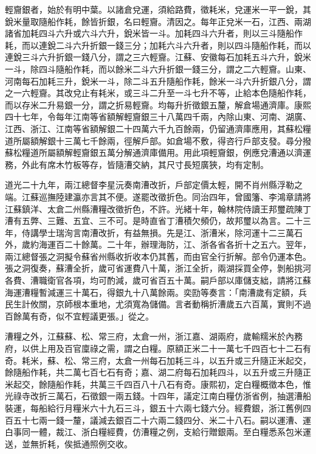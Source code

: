 \begin{pinyinscope}
輕齎銀者，始於有明中葉。以諸倉兌運，須給路費，徵耗米，兌運米一平一銳，其銳米量取隨船作耗，餘皆折銀，名曰輕齎。清因之。每年正兌米一石，江西、兩湖諸省加耗四斗六升或六斗六升，銳米皆一斗。加耗四斗六升者，則以三斗隨船作耗，而以連銳二斗六升折銀一錢三分；加耗六斗六升者，則以四斗隨船作耗，而以連銳三斗六升折銀一錢八分，謂之三六輕齎。江蘇、安徽每石加耗五斗六升，銳米一斗，除四斗隨船作耗，而以餘米二斗六升折銀一錢三分，謂之二六輕齎。山東、河南每石加耗三升，銳米一斗，除二斗五升隨船作耗，餘米一斗六升折銀八分，謂之一六輕齎。其改兌止有耗米，或三斗二升至一斗七升不等，止給本色隨船作耗，而以存米二升易銀一分，謂之折易輕齎。均每升折徵銀五釐，解倉場通濟庫。康熙四十七年，令每年江南等省額解輕齎銀三十八萬四千兩，內除山東、河南、湖廣、江西、浙江、江南等省額解銀二十四萬六千九百餘兩，仍留通濟庫應用，其蘇松糧道所屬額解銀十三萬七千餘兩，徑解戶部。如倉場不敷，得咨行戶部支發。尋分撥蘇松糧道所屬額解輕齎銀五萬分解通濟庫備用。用此項輕齎銀，例應兌漕通以濟運務，外此有席木竹板等存，皆隨漕交納，其尺寸長短廣狹，均有定制。

道光二十九年，兩江總督李星沅奏南漕改折，戶部定價太輕，開不肖州縣浮勒之端。江蘇巡撫陸建瀛亦言其不便。遂罷改徵折色。同治四年，曾國籓、李鴻章請將江蘇鎮洋、太倉二州縣漕糧改徵折色，不許。光緒十年，翰林院侍讀王邦璽疏陳丁漕有五弊、三難、五宜、三不可。是時直省丁漕積欠頻仍，故邦璽以為言。二十三年，侍講學士瑞洵言南漕改折，有益無損。先是江、浙漕米，除河運十二三萬石外，歲約海運百二十餘萬。二十年，辦理海防，江、浙各省各折十之五六。翌年，兩江總督張之洞擬令蘇省州縣收折收本仍其舊，而由官全行折解。部令仍運本色。張之洞復奏，蘇漕全折，歲可省運費八十萬，浙江全折，兩湖採買全停，剝船挑河各費、漕職衛官各項，均可酌減，歲可省百五十萬。嗣戶部以庫儲支絀，請將江蘇海運漕糧暫減運三十萬石，得銀九十八萬餘兩。奕劻等奏言：「南漕歲有定額，兵民生計攸關，京師根本重地，尤須寬為儲備。言者動稱折漕歲五六百萬，實則不過百餘萬有奇，似不宜輕議更張。」從之。

漕糧之外，江蘇蘇、松、常三府，太倉一州，浙江嘉、湖兩府，歲輸糯米於內務府，以供上用及百官廩祿之需，謂之白糧。原額正米二十一萬七千四百七十二石有奇。耗米，蘇、松、常三府，太倉一州每石加耗三斗，以五升或三升隨正米起交，餘隨船作耗，共二萬七百七石有奇；嘉、湖二府每石加耗四斗，以五升或三升隨正米起交，餘隨船作耗，共萬三千四百八十八石有奇。康熙初，定白糧概徵本色，惟光祿寺改折三萬石，石徵銀一兩五錢。十四年，議定江南白糧仿浙省例，抽選漕船裝運，每船給行月糧米六十九石三斗，銀五十六兩七錢六分。經費銀，浙江舊例四百五十七兩一錢一釐，議減去銀百二十六兩二錢四分、米二十八石。嗣以運漕、運白事同一體，裁江、浙白糧經費，仿漕糧之例，支給行贈銀兩。至白糧悉系包米運送，並無折耗，俟抵通照例交收。


\end{pinyinscope}
